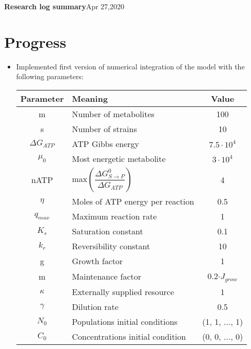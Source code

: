 \documentclass[10pt,letterpaper]{article}
\begin{document}
	
    \LARGE{\textbf{Research log summary}}\hfill\Large{Apr 27,2020}
    \section*{Progress}
	\begin{itemize}
	    \item Implemented first version of numerical integration of the model with the following parameters:\\
	    \begin{center}
	    	\begin{tabular}{ |c|l|c| } 
	    		\hline
	    		 Parameter & Meaning & Value \\
	    		\hline
	    		m &Number of metabolites &  100 \\ 
	    		s &Number of strains &  10 \\ 
	    		$ \Delta G_{ATP} $ &ATP Gibbs energy & $ 7.5\cdot 10^{4} $\\ 
	    		$ \mu_0 $ & Most energetic metabolite &  $ 3\cdot 10^{4} $ \\ 
	    		nATP &max$\left(\dfrac{\Delta G^{0}_{S\rightarrow P}}{\Delta G_{ATP}}\right)$ &  4 \\ 
	    		$ \eta $ &Moles of ATP energy per reaction &  0.5  \\ 
	    		$ q_{max} $ &Maximum reaction rate &  1 \\ 
	    		$ K_s $ &Saturation constant &   0.1 \\ 
	    		$ k_r $ &Reversibility constant &  10 \\ 
	    		g & Growth factor & 1 \\ 
	    		m  & Maintenance factor &   0.2$\cdot J_{grow}$ \\ 
	    		$ \kappa $  & Externally supplied resource &  1 \\ 
	    		$ \gamma $ &Dilution rate &   0.5 \\ 
	    		$ N_{0}$ & Populations initial conditions &   (1, 1, ..., 1)\\ 
	    		$ C_{0}$ & Concentrations initial condition &   (0, 0, ..., 0)\\
	    		\hline
	    	\end{tabular}
	    \end{center}
    

\end{itemize}
\end{document}
